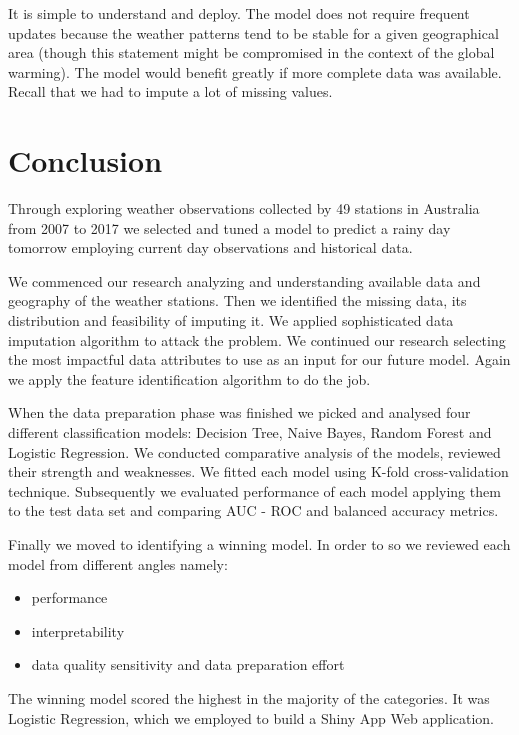 It is simple to understand and deploy. The model does not require
frequent updates because the weather patterns tend to be stable for a
given geographical area (though this statement might be compromised in
the context of the global warming). The model would benefit greatly if
more complete data was available. Recall that we had to impute a lot of
missing values.

\hypertarget{conclusion}{%
\section{Conclusion}\label{conclusion}}

Through exploring weather observations collected by 49 stations in
Australia from 2007 to 2017 we selected and tuned a model to predict a
rainy day tomorrow employing current day observations and historical
data.

We commenced our research analyzing and understanding available data and
geography of the weather stations. Then we identified the missing data,
its distribution and feasibility of imputing it. We applied
sophisticated data imputation algorithm to attack the problem. We
continued our research selecting the most impactful data attributes to
use as an input for our future model. Again we apply the feature
identification algorithm to do the job.

When the data preparation phase was finished we picked and analysed four
different classification models: Decision Tree, Naive Bayes, Random
Forest and Logistic Regression. We conducted comparative analysis of the
models, reviewed their strength and weaknesses. We fitted each model
using K-fold cross-validation technique. Subsequently we evaluated
performance of each model applying them to the test data set and
comparing AUC - ROC and balanced accuracy metrics.

Finally we moved to identifying a winning model. In order to so we
reviewed each model from different angles namely:

\begin{itemize}
\tightlist
\item
  performance
\item
  interpretability
\item
  data quality sensitivity and data preparation effort
\end{itemize}

The winning model scored the highest in the majority of the categories.
It was Logistic Regression, which we employed to build a Shiny App Web
application.

